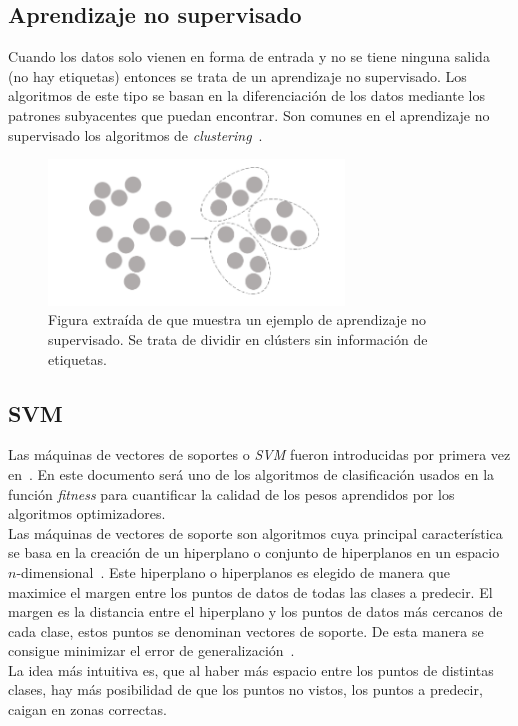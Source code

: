 \subsection{Aprendizaje no supervisado}
Cuando los datos solo vienen en forma de entrada y no se tiene ninguna salida (no hay etiquetas) entonces se trata de un aprendizaje no supervisado. Los algoritmos de este tipo se basan en la diferenciación de los datos mediante los patrones subyacentes que puedan encontrar. Son comunes en el aprendizaje no supervisado los algoritmos de \textit{clustering}~\cite{sah2020machine}.

\begin{figure}[htp]
    \begin{center}
        \includegraphics[width=0.7\textwidth]{imagenes/ml_unsupervised-learning.png}
    \end{center}
    \caption[Aprendizaje no supervisado]{Figura extraída de \cite{sah2020machine} que muestra un ejemplo de aprendizaje no supervisado. Se trata de dividir en clústers sin información de etiquetas.}
\end{figure}

\subsection{SVM}
Las máquinas de vectores de soportes o \textit{SVM} fueron introducidas por primera vez en~\cite{cortes_support-vector_1995}. En este documento será uno de los algoritmos de clasificación usados en la función \textit{fitness} para cuantificar la calidad de los pesos aprendidos por los algoritmos optimizadores.\\[6pt]
Las máquinas de vectores de soporte son algoritmos cuya principal característica se basa en la creación de un hiperplano o conjunto de hiperplanos en un espacio $n$-dimensional~\cite{scikit-learn-svm,}. Este hiperplano o hiperplanos es elegido de manera que maximice el margen entre los puntos de datos de todas las clases a predecir. El margen es la distancia entre el hiperplano y los puntos de datos más cercanos de cada clase, estos puntos se denominan vectores de soporte. De esta manera se consigue minimizar el error de generalización~\cite{hastie2009elements}.\\[6pt]
La idea más intuitiva es, que al haber más espacio entre los puntos de distintas clases, hay más posibilidad de que los puntos no vistos, los puntos a predecir, caigan en zonas correctas.

